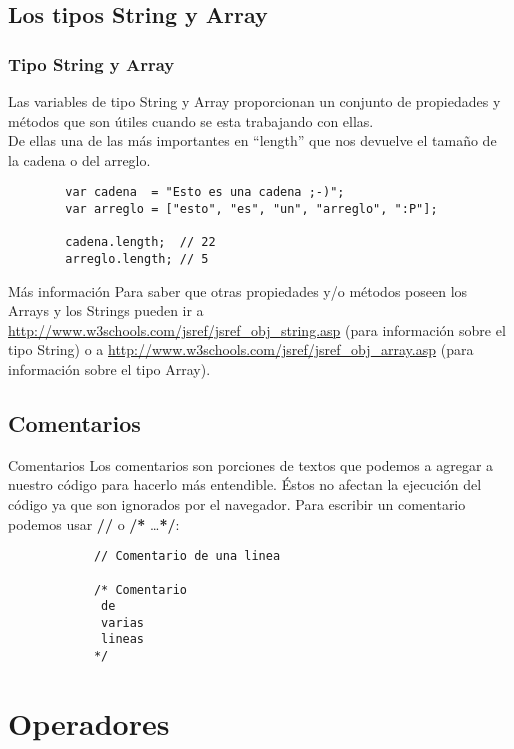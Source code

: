 \documentclass[handout, 10pt]{beamer}
\begin{document}
\subsection{Los tipos String y Array}
\begin{frame}[fragile]
	\frametitle{Tipo String y Array}
	\pause Las variables de tipo String y Array proporcionan un conjunto de propiedades y métodos que son
			útiles cuando se esta trabajando con ellas. \\
	
	\pause De ellas una de las más importantes en ``length'' que nos devuelve el tamaño de la cadena
	o del arreglo.
	
	\pause
	\begin{lstlisting}
		var cadena  = "Esto es una cadena ;-)";
		var arreglo = ["esto", "es", "un", "arreglo", ":P"];
		
		cadena.length;  // 22
		arreglo.length; // 5
	\end{lstlisting}
	
	\pause
	\begin{block}{Más información}
		Para saber que otras propiedades y/o métodos poseen los Arrays y los Strings pueden ir a 
		\url{http://www.w3schools.com/jsref/jsref_obj_string.asp} (para información sobre el tipo
		String) o a \url{http://www.w3schools.com/jsref/jsref_obj_array.asp} (para información sobre
		el tipo Array).
	\end{block}
\end{frame}

\subsection{Comentarios}
\begin{frame}[fragile]
	\begin{block}{Comentarios}
		Los comentarios son porciones de textos que podemos a agregar a nuestro código para hacerlo más
		entendible. Éstos no afectan la ejecución del código ya que son ignorados por el navegador. Para
		escribir un comentario podemos usar \textbf{//} o \textbf{/*} \ldots \textbf{*/}:
		\begin{lstlisting}
			// Comentario de una linea
			
			/* Comentario
			 de
			 varias
			 lineas
			*/
		\end{lstlisting}
  \end{block}
\end{frame}


\section{Operadores}
\end{document}
